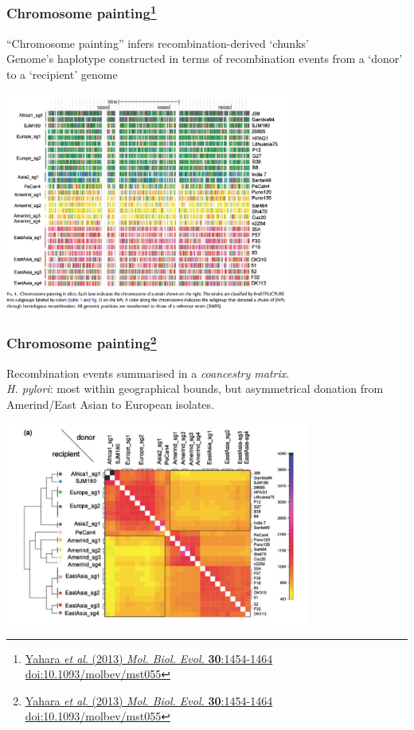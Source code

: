 \begin{frame}
  \frametitle{Chromosome painting\footnote{\tiny{\href{http://dx.doi.org/10.1093/molbev/mst055}{Yahara \textit{et al}. (2013) \textit{Mol. Biol. Evol.} \textbf{30}:1454-1464 doi:10.1093/molbev/mst055}}}}
  ``Chromosome painting'' infers recombination-derived `chunks'\\
  Genome's haplotype constructed in terms of recombination events from a `donor' to a `recipient' genome\\
  \begin{center}
    \includegraphics[width=0.7\textwidth]{images/chromosome_painting}
  \end{center}     
\end{frame}

\begin{frame}
  \frametitle{Chromosome painting\footnote{\tiny{\href{http://dx.doi.org/10.1093/molbev/mst055}{Yahara \textit{et al}. (2013) \textit{Mol. Biol. Evol.} \textbf{30}:1454-1464 doi:10.1093/molbev/mst055}}}}
  Recombination events summarised in a \textit{coancestry matrix}.\\
  \textit{H. pylori}: most within geographical bounds, but asymmetrical donation from Amerind/East Asian to European isolates.
  \begin{center}
    \includegraphics[width=0.75\textwidth]{images/coancestry}
  \end{center}     
\end{frame}

